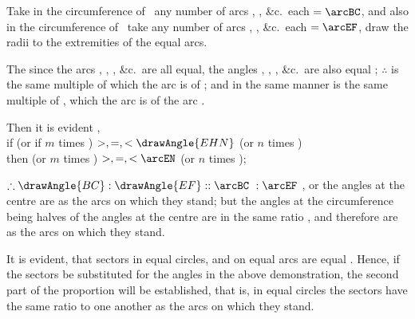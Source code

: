 \documentclass[booklanguage=english]{byrnebook}
\begin{document}
Take in the circumference of \circleG\ any number of arcs
,
, \&c.\ each $= \arcBC$, and also in the circumference of \circleH\ take any number of arcs
,
, \&c.\ each $= \arcEF$, draw the radii to the extremities of the equal arcs.

The since the arcs \arcBC, \arcCK, \arcKL, \&c.\ are all equal, the angles , , , \&c.\ are also equal ; $\therefore$  is the same multiple of  which the arc  is of \arcBC; and in the same manner  is the same multiple of , which the arc  is of the arc \arcEF.

\begin{center}
Then it is evident ,\\
if  (or if $m$ times ) $>, =, < \drawAngle{EHN}$ (or $n$ times )\\
then \arcBL (or $m$ times \arcBC) $>, =, < \arcEN$ (or $n$ times \arcEF);
\end{center}

$\therefore \drawAngle{BC} : \drawAngle{EF} :: \arcBC\ : \arcEF$ , or the angles at the centre are as the arcs on which they stand; but the angles at the circumference being halves of the angles at the centre  are in the same ratio , and therefore are as the arcs on which they stand.

It is evident, that sectors in equal circles, and on equal arcs are equal . Hence, if the sectors be substituted for the angles in the above demonstration, the second part of the proportion will be established, that is, in equal circles the sectors have the same ratio to one another as the arcs on which they stand.
\end{document}
